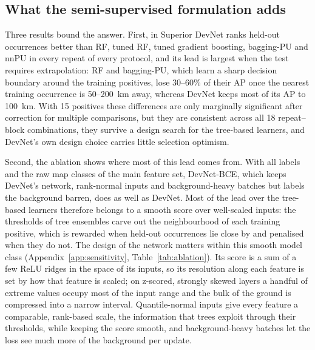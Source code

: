 \documentclass[pdflatex,sn-apa]{sn-jnl}
\begin{document}
\subsection{What the semi-supervised formulation adds}\label{sec:disc-devnet}

Three results bound the answer. First, in Superior DevNet ranks held-out occurrences better than RF, tuned RF, tuned gradient boosting, bagging-PU and nnPU in every repeat of every protocol, and its lead is largest when the test requires extrapolation: RF and bagging-PU, which learn a sharp decision boundary around the training positives, lose 30--60\% of their AP once the nearest training occurrence is 50--200~km away, whereas DevNet keeps most of its AP to 100~km. With 15 positives these differences are only marginally significant after correction for multiple comparisons, but they are consistent across all 18 repeat--block combinations, they survive a design search for the tree-based learners, and DevNet's own design choice carries little selection optimism.

Second, the ablation shows where most of this lead comes from. With all labels and the raw map classes of the main feature set, DevNet-BCE, which keeps DevNet's network, rank-normal inputs and background-heavy batches but labels the background barren, does as well as DevNet. Most of the lead over the tree-based learners therefore belongs to a smooth score over well-scaled inputs: the thresholds of tree ensembles carve out the neighbourhood of each training positive, which is rewarded when held-out occurrences lie close by and penalised when they do not. The design of the network matters within this smooth model class (Appendix~\ref{app:sensitivity}, Table~\ref{tab:ablation}). Its score is a sum of a few ReLU ridges in the space of its inputs, so its resolution along each feature is set by how that feature is scaled; on z-scored, strongly skewed layers a handful of extreme values occupy most of the input range and the bulk of the ground is compressed into a narrow interval. Quantile-normal inputs give every feature a comparable, rank-based scale, the information that trees exploit through their thresholds, while keeping the score smooth, and background-heavy batches let the loss see much more of the background per update.
\end{document}

